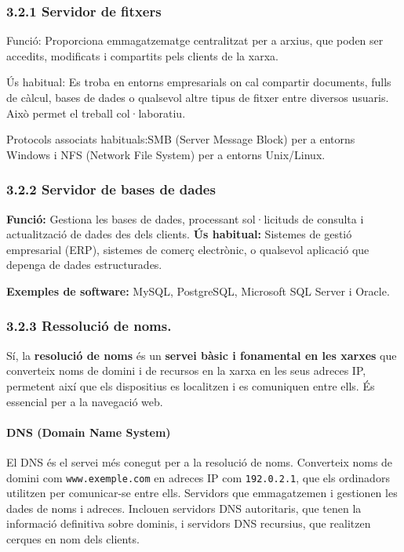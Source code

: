 \documentclass[
  a4paper,
]{article}
\begin{document}
\subsubsection{3.2.1 Servidor de fitxers}\label{servidor-de-fitxers}

Funció: Proporciona emmagatzematge centralitzat per a arxius, que poden
ser accedits, modificats i compartits pels clients de la xarxa.

Ús habitual: Es troba en entorns empresarials on cal compartir
documents, fulls de càlcul, bases de dades o qualsevol altre tipus de
fitxer entre diversos usuaris. Això permet el treball col·laboratiu.

Protocols associats habituals:SMB (Server Message Block) per a entorns
Windows i NFS (Network File System) per a entorns Unix/Linux.

\subsubsection{3.2.2 Servidor de bases de
dades}\label{servidor-de-bases-de-dades}

\textbf{Funció:} Gestiona les bases de dades, processant sol·licituds de
consulta i actualització de dades des dels clients. \textbf{Ús
habitual:} Sistemes de gestió empresarial (ERP), sistemes de comerç
electrònic, o qualsevol aplicació que depenga de dades estructurades.

\textbf{Exemples de software:} MySQL, PostgreSQL, Microsoft SQL Server i
Oracle.

\subsubsection{3.2.3 Ressolució de noms.}\label{ressoluciuxf3-de-noms.}

Sí, la \textbf{resolució de noms} és un \textbf{servei bàsic i
fonamental en les xarxes} que converteix noms de domini i de recursos en
la xarxa en les seus adreces IP, permetent així que els dispositius es
localitzen i es comuniquen entre ells. És essencial per a la navegació
web.

\paragraph{DNS (Domain Name System)}\label{dns-domain-name-system}

El DNS és el servei més conegut per a la resolució de noms. Converteix
noms de domini com \texttt{www.exemple.com} en adreces IP com
\texttt{192.0.2.1}, que els ordinadors utilitzen per comunicar-se entre
ells. Servidors que emmagatzemen i gestionen les dades de noms i
adreces. Inclouen servidors DNS autoritaris, que tenen la informació
definitiva sobre dominis, i servidors DNS recursius, que realitzen
cerques en nom dels clients.
\end{document}
